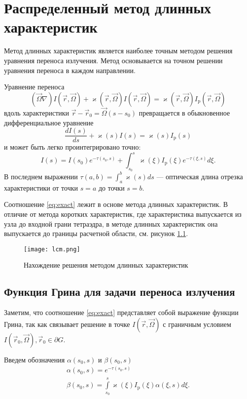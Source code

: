 \chapter{Распределенный метод длинных характеристик}

Метод длинных характеристик является наиболее точным методом решения уравнения переноса излучения. Метод основывается на точном решении уравнения переноса в каждом направлении.

Уравнение переноса 
\[
(\vec \Omega \nabla) I(\vec r, \vec \Omega) + \varkappa(\vec r, \vec \Omega) I(\vec r, \vec \Omega) = \varkappa(\vec r, \vec \Omega) I_\text{p}(\vec r, \vec \Omega)
\]
вдоль характеристики
$
\vec r - \vec r_0 = \vec \Omega (s - s_0)
$
превращается в обыкновенное дифференциальное уравнение
\[
\frac{dI(s)}{ds} + \varkappa(s) I(s) = \varkappa(s) I_\text{p}(s)
\]
и может быть легко проинтегрировано точно:
\begin{equation}
I(s) = I(s_0) e^{-\tau(s_0, s)} + \int_{s_0}^s \varkappa(\xi) I_\text{p}(\xi)
e^{-\tau(\xi,s)} d\xi.
\label{eq:exact}
\end{equation}
В последнем выражении $\tau(a,b) = \int_a^b \varkappa(s) ds$ --- оптическая длина отрезка характеристики от точки $s = a$ до точки $s = b$.

Соотношение \eqref{eq:exact} лежит в основе метода длинных характеристик. В отличие от метода коротких характеристик, где характеристика выпускается из узла до входной грани тетраэдра, в методе длинных характеристик она выпускается до границы расчетной области, см. рисунок \ref{fig:lcm}.
\begin{figure}[ht!]
\centering
\texttt{[image: lcm.png]}
\caption{Нахождение решения методом длинных характеристик}
\label{fig:lcm}
\end{figure}

\section{Функция Грина для задачи переноса излучения}

Заметим, что соотношение \eqref{eq:exact} представляет собой выражение функции Грина, так как связывает решение в точке $I(\vec r, \vec \Omega)$ с граничным условием $I(\vec r_0, \vec \Omega), \vec r_0 \in \partial G$.

Введем обозначения $\alpha(s_0, s)$ и $\beta(s_0, s)$ 
\begin{gather*}
\alpha(s_0, s) = e^{-\tau(s_0, s)}\\
\beta(s_0, s) = \int\limits_{s_0}^s \varkappa(\xi) I_\text{p}(\xi) \alpha(\xi, s) d\xi.
\end{gather*}

